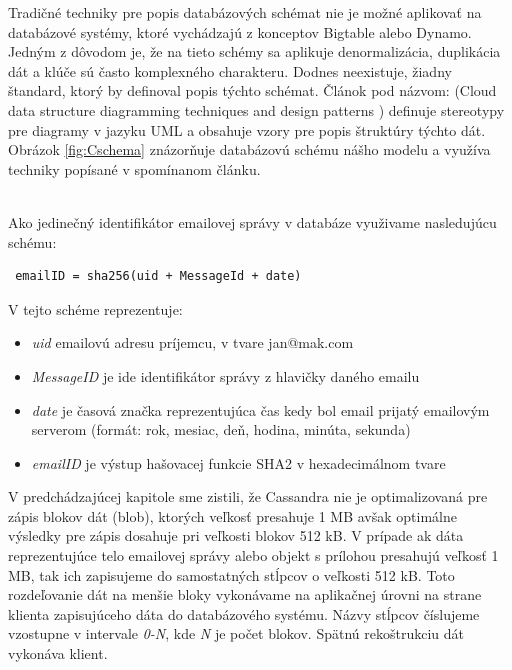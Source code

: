 \documentclass[11pt,twoside,a4paper]{book}
\begin{document}
Tradičné techniky pre popis databázových schémat nie je možné aplikovať na databázové systémy, ktoré vychádzajú z konceptov Bigtable alebo Dynamo. Jedným z dôvodom je, že na tieto schémy sa aplikuje denormalizácia, duplikácia dát a klúče sú často komplexného charakteru. Dodnes neexistuje, žiadny štandard, ktorý by definoval popis týchto schémat. Článok pod názvom:  (Cloud data structure diagramming techniques and design patterns \cite{CloudDataStructureDiag}) definuje stereotypy pre diagramy v jazyku UML a obsahuje vzory pre popis štruktúry týchto dát. Obrázok \ref{fig:Cschema} znázorňuje databázovú schému nášho modelu a využíva techniky popísané v spomínanom článku.

\noindent
\\
Ako jedinečný identifikátor emailovej správy v databáze využivame nasledujúcu schému:
\begin{verbatim}
 emailID = sha256(uid + MessageId + date)
\end{verbatim}

\noindent
V tejto schéme reprezentuje:
\begin{itemize}
 \item \emph{uid} emailovú adresu príjemcu, v tvare jan@mak.com
 \item \emph{MessageID} je ide identifikátor správy z hlavičky daného emailu
 \item \emph{date} je časová značka reprezentujúca čas kedy bol email prijatý emailovým serverom (formát: rok, mesiac, deň, hodina, minúta, sekunda)
 \item \emph{emailID} je výstup hašovacej funkcie SHA2 v hexadecimálnom tvare
\end{itemize}


V predchádzajúcej kapitole sme zistili, že Cassandra nie je optimalizovaná pre zápis blokov dát (blob), ktorých veľkosť presahuje 1 MB avšak optimálne výsledky pre zápis dosahuje pri veľkosti blokov 512 kB. V prípade ak dáta reprezentujúce telo emailovej správy alebo objekt s prílohou presahujú veľkosť 1 MB, tak ich zapisujeme do samostatných stĺpcov o veľkosti 512 kB. Toto rozdeľovanie dát na menšie bloky vykonávame na aplikačnej úrovni na strane klienta zapisujúceho dáta do databázového systému. Názvy stĺpcov číslujeme vzostupne v intervale \emph{0-N}, kde \emph{N} je počet blokov. Spätnú rekoštrukciu dát vykonáva klient.
\end{document}
